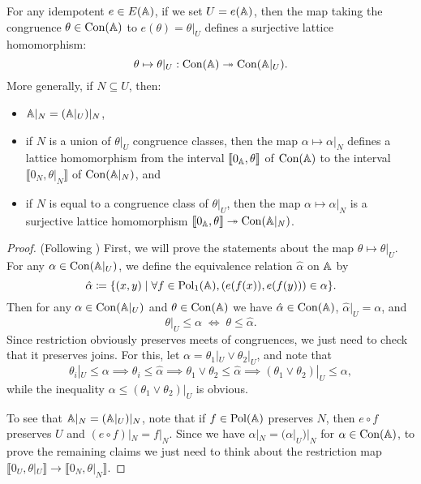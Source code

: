 \begin{appendices}
\begin{lem}\label{lem-idempotent-surjective-lattice} For any idempotent $e \in E(\mathbb{A})$, if we set $U = e(\mathbb{A})$, then the map taking the congruence $\theta \in \operatorname{Con}(\mathbb{A})$ to $e(\theta) = \theta|_U$ defines a surjective lattice homomorphism:
\[
\theta \mapsto \theta|_U : \operatorname{Con}(\mathbb{A}) \twoheadrightarrow \operatorname{Con}(\mathbb{A}|_U).
\]
More generally, if $N \subseteq U$, then:
\begin{itemize}
\item $\mathbb{A}|_N = (\mathbb{A}|_U)|_N$,
\item if $N$ is a union of $\theta|_U$ congruence classes, then the map $\alpha \mapsto \alpha|_N$ defines a lattice homomorphism from the interval $\llbracket 0_{\mathbb{A}}, \theta \rrbracket$ of $\operatorname{Con}(\mathbb{A})$ to the interval $\llbracket 0_N, \theta|_N \rrbracket$ of $\operatorname{Con}(\mathbb{A}|_N)$, and
\item if $N$ is equal to a congruence class of $\theta|_U$, then the map $\alpha \mapsto \alpha|_N$ is a surjective lattice homomorphism $\llbracket 0_{\mathbb{A}}, \theta \rrbracket \twoheadrightarrow \operatorname{Con}(\mathbb{A}|_N)$.
\end{itemize}
\end{lem}
\begin{proof} (Following \cite{hobby-mckenzie}) First, we will prove the statements about the map $\theta \mapsto \theta|_U$. For any $\alpha \in \operatorname{Con}(\mathbb{A}|_U)$, we define the equivalence relation $\hat{\alpha}$ on $\mathbb{A}$ by
\[
\hat{\alpha} \coloneqq \{(x,y) \mid \forall f \in \operatorname{Pol}_1(\mathbb{A}), (e(f(x)), e(f(y))) \in \alpha\}.
\]
Then for any $\alpha \in \operatorname{Con}(\mathbb{A}|_U)$ and $\theta \in \operatorname{Con}(\mathbb{A})$ we have $\hat{\alpha} \in \operatorname{Con}(\mathbb{A})$, $\hat{\alpha}|_U = \alpha$, and
\[
\theta|_U \le \alpha \; \iff \; \theta \le \hat{\alpha}.
\]
Since restriction obviously preserves meets of congruences, we just need to check that it preserves joins. For this, let $\alpha = \theta_1|_U \vee \theta_2|_U$, and note that
\[
\theta_i|_U \le \alpha \implies \theta_i \le \hat{\alpha} \implies \theta_1 \vee \theta_2 \le \hat{\alpha} \implies (\theta_1\vee\theta_2)|_U \le \alpha,
\]
while the inequality $\alpha \le (\theta_1\vee\theta_2)|_U$ is obvious.

To see that $\mathbb{A}|_N = (\mathbb{A}|_U)|_N$, note that if $f \in \operatorname{Pol}(\mathbb{A})$ preserves $N$, then $e\circ f$ preserves $U$ and $(e \circ f)|_N = f|_N$. Since we have $\alpha|_N = (\alpha|_U)|_N$ for $\alpha \in \operatorname{Con}(\mathbb{A})$, to prove the remaining claims we just need to think about the restriction map $\llbracket 0_U, \theta|_U \rrbracket \rightarrow \llbracket 0_N, \theta|_N \rrbracket$.


\end{proof}
\end{appendices}

